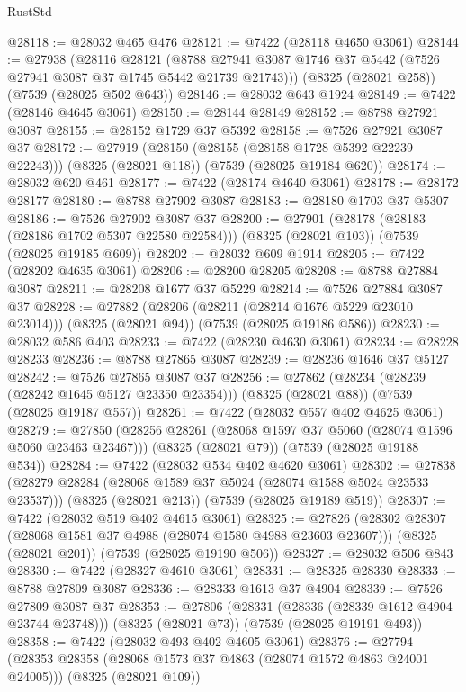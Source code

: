 \begin{lexlean}{RustStd}
\begin{coremodule}
@28118 := @28032 @465 @476
@28121 := @7422 (@28118 @4650 @3061)
@28144 := @27938
    (@28116
      @28121
      (@8788 @27941 @3087 @1746 @37 @5442 (@7526 @27941 @3087 @37 @1745 @5442 @21739 @21743)))
    (@8325 (@28021 @258))
    (@7539 (@28025 @502 @643))
@28146 := @28032 @643 @1924
@28149 := @7422 (@28146 @4645 @3061)
@28150 := @28144 @28149
@28152 := @8788 @27921 @3087
@28155 := @28152 @1729 @37 @5392
@28158 := @7526 @27921 @3087 @37
@28172 := @27919
    (@28150 (@28155 (@28158 @1728 @5392 @22239 @22243)))
    (@8325 (@28021 @118))
    (@7539 (@28025 @19184 @620))
@28174 := @28032 @620 @461
@28177 := @7422 (@28174 @4640 @3061)
@28178 := @28172 @28177
@28180 := @8788 @27902 @3087
@28183 := @28180 @1703 @37 @5307
@28186 := @7526 @27902 @3087 @37
@28200 := @27901
    (@28178 (@28183 (@28186 @1702 @5307 @22580 @22584)))
    (@8325 (@28021 @103))
    (@7539 (@28025 @19185 @609))
@28202 := @28032 @609 @1914
@28205 := @7422 (@28202 @4635 @3061)
@28206 := @28200 @28205
@28208 := @8788 @27884 @3087
@28211 := @28208 @1677 @37 @5229
@28214 := @7526 @27884 @3087 @37
@28228 := @27882
    (@28206 (@28211 (@28214 @1676 @5229 @23010 @23014)))
    (@8325 (@28021 @94))
    (@7539 (@28025 @19186 @586))
@28230 := @28032 @586 @403
@28233 := @7422 (@28230 @4630 @3061)
@28234 := @28228 @28233
@28236 := @8788 @27865 @3087
@28239 := @28236 @1646 @37 @5127
@28242 := @7526 @27865 @3087 @37
@28256 := @27862
    (@28234 (@28239 (@28242 @1645 @5127 @23350 @23354)))
    (@8325 (@28021 @88))
    (@7539 (@28025 @19187 @557))
@28261 := @7422 (@28032 @557 @402 @4625 @3061)
@28279 := @27850
    (@28256 @28261 (@28068 @1597 @37 @5060 (@28074 @1596 @5060 @23463 @23467)))
    (@8325 (@28021 @79))
    (@7539 (@28025 @19188 @534))
@28284 := @7422 (@28032 @534 @402 @4620 @3061)
@28302 := @27838
    (@28279 @28284 (@28068 @1589 @37 @5024 (@28074 @1588 @5024 @23533 @23537)))
    (@8325 (@28021 @213))
    (@7539 (@28025 @19189 @519))
@28307 := @7422 (@28032 @519 @402 @4615 @3061)
@28325 := @27826
    (@28302 @28307 (@28068 @1581 @37 @4988 (@28074 @1580 @4988 @23603 @23607)))
    (@8325 (@28021 @201))
    (@7539 (@28025 @19190 @506))
@28327 := @28032 @506 @843
@28330 := @7422 (@28327 @4610 @3061)
@28331 := @28325 @28330
@28333 := @8788 @27809 @3087
@28336 := @28333 @1613 @37 @4904
@28339 := @7526 @27809 @3087 @37
@28353 := @27806
    (@28331 (@28336 (@28339 @1612 @4904 @23744 @23748)))
    (@8325 (@28021 @73))
    (@7539 (@28025 @19191 @493))
@28358 := @7422 (@28032 @493 @402 @4605 @3061)
@28376 := @27794
    (@28353 @28358 (@28068 @1573 @37 @4863 (@28074 @1572 @4863 @24001 @24005)))
    (@8325 (@28021 @109))

\end{coremodule}
\end{lexlean}
